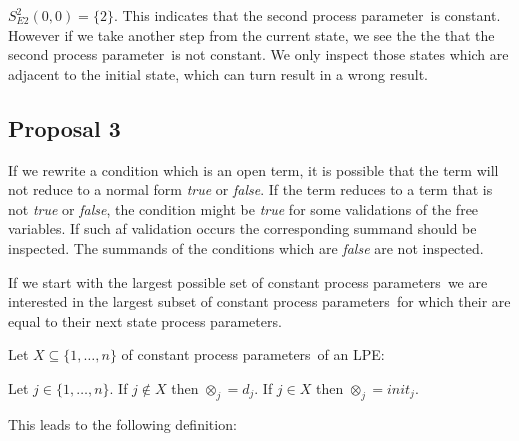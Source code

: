 \documentclass[a4paper,10pt]{article}
\theoremstyle{plain}
\theoremstyle{definition}
\newcommand{\ovr}{\overrightarrow}
\newcommand{\pp}{process parameter}
\newcommand{\pps}{process parameters}
\newcommand{\ti}{\textit}
\begin{document}
\begin{defn}
$S_{E2}^2(0,0) = \lbrace 2 \rbrace$. This indicates that the second \pp\ is constant. However if we take another step from the current state, we see the the that the second \pp\ is not constant. We only inspect those states which are adjacent to the initial state, which can turn result in a wrong result.
\end{defn}

\subsection{Proposal 3}
If we rewrite a condition which is an open term, it is possible
that the term will not reduce to a normal form \ti{true} or \ti{false}. If the term reduces to a
term that is not \ti{true} or \ti{false}, the condition might be \ti{true} for some validations of the free variables. If such af validation occurs the corresponding summand should be inspected. The summands of the conditions which are \ti{false} are not inspected. 

If we start with the largest possible set of constant \pps\ we are interested in the largest subset of constant \pps\ for which their are equal to their next state \pps.

Let $X \subseteq \lbrace 1, \ldots, n \rbrace$ of constant \pps\ of an LPE:

\begin{defn} [We define $\ovr{\otimes_X}$]
Let $j \in \lbrace 1, \dots, n \rbrace $. 
If $j \not\in X$ then $\otimes_j = d_j$. 
If $j \in X$ then $\otimes_j = init_j$.
\end{defn}

 
This leads to the following definition: 
\end{document}
